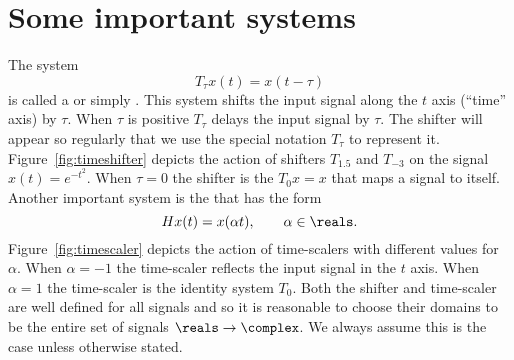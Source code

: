 \section{Some important systems}\label{sec:some-import-syst}

The system
\[
T_\tau x(t) = x(t - \tau)
\]
is called a  or simply .  This system shifts the input signal along the $t$ axis (``time'' axis) by $\tau$.  When $\tau$ is positive $T_{\tau}$ delays the input signal by $\tau$.  The shifter will appear so regularly that we use the special notation $T_\tau$ to represent it.  Figure~\ref{fig:timeshifter} depicts the action of shifters $T_{1.5}$ and $T_{-3}$ on the signal $x(t) = e^{-t^2}$.  When $\tau=0$ the shifter is the  $T_0 x = x$ that maps a signal to itself.  Another important system is the  that has the form
\[
H x(t) = x(\alpha t), \qquad \alpha \in \reals.
\]
Figure~\ref{fig:timescaler} depicts the action of time-scalers with different values for $\alpha$.  When $\alpha=-1$ the time-scaler reflects the input signal in the $t$ axis.  When $\alpha = 1$ the time-scaler is the identity system $T_0$.  Both the shifter and time-scaler are well defined for all signals and so it is reasonable to choose their domains to be the entire set of signals $\reals \to \complex$.  We always assume this is the case unless otherwise stated.


